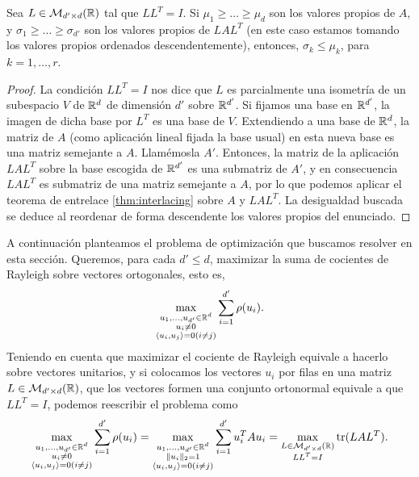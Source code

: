 \begin{cor} \label{cor: interlace}
    Sea $L \in \mathcal{M}_{d' \times d}(\mathbb{R})$ tal que $LL^T = I$. Si $\mu_1 \ge \dots \ge \mu_d$ son los valores propios de $A$, y $\sigma_1 \ge \dots \ge \sigma_{d'}$ son los valores propios de $LAL^T$ (en este caso estamos tomando los valores propios ordenados descendentemente), entonces, $\sigma_k \le \mu_k$, para $k = 1,\dots,r$.
\end{cor}

\begin{proof}
    La condición $LL^T = I$ nos dice que $L$ es parcialmente una isometría de un subespacio $V$ de $\mathbb{R}^d$ de dimensión $d'$  sobre $\mathbb{R}^{d'}$. Si fijamos una base en $\mathbb{R}^{d'}$, la imagen de dicha base por $L^T$ es una base de $V$. Extendiendo a una base de $\mathbb{R}^d$, la matriz de $A$ (como aplicación lineal fijada la base usual) en esta nueva base es una matriz semejante a $A$. Llamémosla $A'$. Entonces, la matriz de la aplicación $LAL^T$ sobre la base escogida de $\mathbb{R}^{d'}$ es una submatriz de $A'$, y en consecuencia $LAL^T$ es submatriz de una matriz semejante a $A$, por lo que podemos aplicar el teorema de entrelace \ref{thm:interlacing} sobre $A$ y $LAL^T$. La desigualdad buscada se deduce al reordenar de forma descendente los valores propios del enunciado.
\end{proof}

A continuación planteamos el problema de optimización que buscamos resolver en esta sección. Queremos, para cada $d' \le d$, maximizar la suma de cocientes de Rayleigh sobre vectores ortogonales, esto es,
\begin{equation}
    \max_{\substack{u_1,\dots,u_{d'} \in  \mathbb{R}^d \\ u_i \ne 0 \\ \langle u_i, u_j \rangle = 0 (i \ne j)}} \sum_{i=1}^{d'} \rho(u_i).
\end{equation}
Teniendo en cuenta que maximizar el cociente de Rayleigh equivale a hacerlo sobre vectores unitarios, y si colocamos los vectores $u_i$ por filas en una matriz $L \in \mathcal{M}_{d'\times d}(\mathbb{R})$, que los vectores formen una conjunto ortonormal equivale a que $LL^T = I$, podemos reescribir el problema como
\begin{equation}
    \max_{\substack{u_1,\dots,u_{d'} \in  \mathbb{R}^d \\ u_i \ne 0 \\ \langle u_i, u_j \rangle = 0 (i \ne j)}} \sum_{i=1}^{d'} \rho(u_i) = \max_{\substack{u_1,\dots,u_{d'} \in  \mathbb{R}^d \\ \|u_i\|_2 = 1 \\ \langle u_i, u_j \rangle = 0 (i \ne j)}} \sum_{i=1}^{d'} u_i^TAu_i = \max_{\substack{L \in \mathcal{M}_{d'\times d}(\mathbb{R}) \\ LL^T  = I}} \operatorname{tr}(LAL^T). 
\end{equation}

